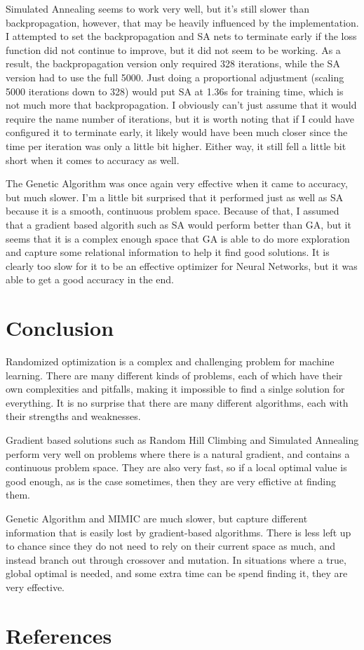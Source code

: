\documentclass[
	letterpaper, %
]{mlreport}
\begin{document}
Simulated Annealing seems to work very well, but it's still slower than backpropagation, however, that may be heavily influenced by the implementation. I attempted to set the backpropagation and SA nets to terminate early if the loss function did not continue to improve, but it did not seem to be working. As a result, the backpropagation version only required 328 iterations, while the SA version had to use the full 5000. Just doing a proportional adjustment (scaling 5000 iterations down to 328) would put SA at 1.36s for training time, which is not much more that backpropagation. I obviously can't just assume that it would require the name number of iterations, but it is worth noting that if I could have configured it to terminate early, it likely would have been much closer since the time per iteration was only a little bit higher. Either way, it still fell a little bit short when it comes to accuracy as well.

The Genetic Algorithm was once again very effective when it came to accuracy, but much slower. I'm a little bit surprised that it performed just as well as SA because it is a smooth, continuous problem space. Because of that, I assumed that a gradient based algorith such as SA would perform better than GA, but it seems that it is a complex enough space that GA is able to do more exploration and capture some relational information to help it find good solutions. It is clearly too slow for it to be an effective optimizer for Neural Networks, but it was able to get a good accuracy in the end.

\section{Conclusion}
Randomized optimization is a complex and challenging problem for machine learning. There are many different kinds of problems, each of which have their own complexities and pitfalls, making it impossible to find a sinlge solution for everything. It is no surprise that there are many different algorithms, each with their strengths and weaknesses.

Gradient based solutions such as Random Hill Climbing and Simulated Annealing perform very well on problems where there is a natural gradient, and contains a continuous problem space. They are also very fast, so if a local optimal value is good enough, as is the case sometimes, then they are very effictive at finding them.

Genetic Algorithm and MIMIC are much slower, but capture different information that is easily lost by gradient-based algorithms. There is less left up to chance since they do not need to rely on their current space as much, and instead branch out through crossover and mutation. In situations where a true, global optimal is needed, and some extra time can be spend finding it, they are very effective.

\newpage

\section{References}
\nocite{Hayes19}
\nocite{Mitchell}
\nocite{Rollings20}
\printbibliography
\end{document}
